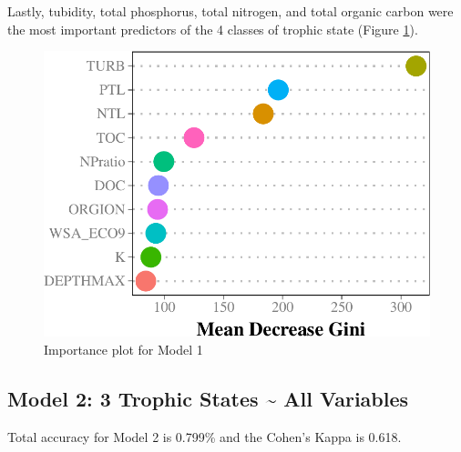 \documentclass[11pt,]{article}
\begin{document}
Lastly, tubidity, total phosphorus, total nitrogen, and total organic
carbon were the most important predictors of the 4 classes of trophic
state (Figure \ref{fig:Importance_Model1}).

\begin{figure}[htbp]
\centering
\includegraphics{./manuscript_files/figure-latex/Importance_Model1.pdf}
\caption{Importance plot for Model 1\label{fig:Importance_Model1}}
\end{figure}

\subsection{Model 2: 3 Trophic States \textasciitilde{} All
Variables}\label{model-2-3-trophic-states-all-variables}

Total accuracy for Model 2 is 0.799\% and the Cohen's Kappa is 0.618.
\end{document}
